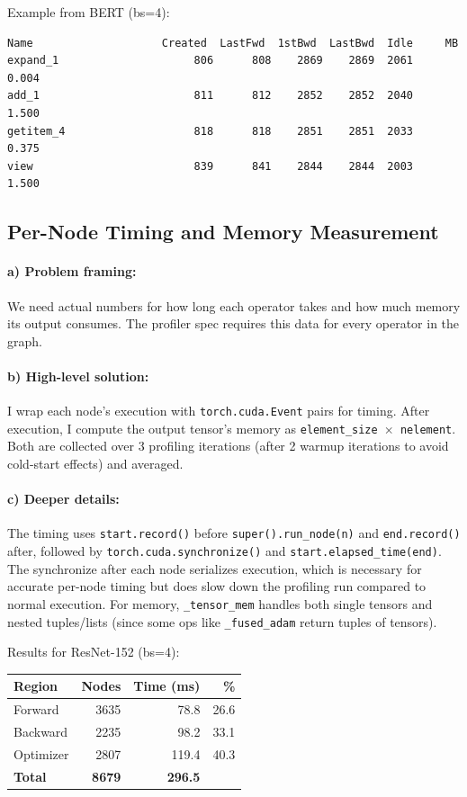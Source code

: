 \documentclass[11pt]{article}
\begin{document}
Example from BERT (bs=4):
\begin{lstlisting}
Name                    Created  LastFwd  1stBwd  LastBwd  Idle     MB
expand_1                     806      808    2869    2869  2061   0.004
add_1                        811      812    2852    2852  2040   1.500
getitem_4                    818      818    2851    2851  2033   0.375
view                         839      841    2844    2844  2003   1.500
\end{lstlisting}

\subsection{Per-Node Timing and Memory Measurement}

\paragraph{a) Problem framing:} We need actual numbers for how long each operator takes and how much memory its output consumes. The profiler spec requires this data for every operator in the graph.

\paragraph{b) High-level solution:} I wrap each node's execution with \texttt{torch.cuda.Event} pairs for timing. After execution, I compute the output tensor's memory as \texttt{element\_size $\times$ nelement}. Both are collected over 3 profiling iterations (after 2 warmup iterations to avoid cold-start effects) and averaged.

\paragraph{c) Deeper details:} The timing uses \texttt{start.record()} before \texttt{super().run\_node(n)} and \texttt{end.record()} after, followed by \texttt{torch.cuda.synchronize()} and \texttt{start.elapsed\_time(end)}. The synchronize after each node serializes execution, which is necessary for accurate per-node timing but does slow down the profiling run compared to normal execution. For memory, \texttt{\_tensor\_mem} handles both single tensors and nested tuples/lists (since some ops like \texttt{\_fused\_adam} return tuples of tensors).

Results for ResNet-152 (bs=4):

\begin{table}[h]
\centering
\begin{tabular}{lrrr}
\toprule
Region & Nodes & Time (ms) & \% \\
\midrule
Forward   & 3635 &  78.8 & 26.6 \\
Backward  & 2235 &  98.2 & 33.1 \\
Optimizer & 2807 & 119.4 & 40.3 \\
\midrule
\textbf{Total} & \textbf{8679} & \textbf{296.5} & \\
\bottomrule
\end{tabular}
\end{table}
\end{document}
